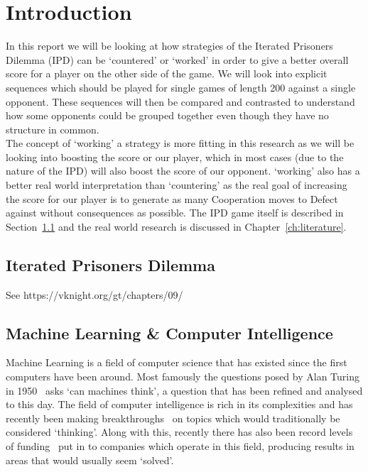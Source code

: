 
\chapter{Introduction}\label{ch:intro}
In this report we will be looking at how strategies of the Iterated Prisoners Dilemma (IPD) can be `countered' or `worked' in order to give a better overall score for a player on the other side of the game.
We will look into explicit sequences which should be played for single games of length 200 against a single opponent.
These sequences will then be compared and contrasted to understand how some opponents could be grouped together even though they have no structure in common.\\

The concept of `working' a strategy is more fitting in this research as we will be looking into boosting the score or our player, which in most cases (due to the nature of the IPD) will also boost the score of our opponent.
`working' also has a better real world interpretation than `countering' as the real goal of increasing the score for our player is to generate as many Cooperation moves to Defect against without consequences as possible.
The IPD game itself is described in Section~\ref{sec:iteratedPrisonersDilemma} and the real world research is discussed in Chapter~\ref{ch:literature}.

\section{Iterated Prisoners Dilemma}\label{sec:iteratedPrisonersDilemma}

See https://vknight.org/gt/chapters/09/

\section{Machine Learning \& Computer Intelligence}\label{sec:machineLearningAndcomputerIntelligence}
Machine Learning is a field of computer science that has existed since the first computers have been around.
Most famously the questions posed by Alan Turing in 1950~\cite{turing1950computing} asks `can machines think', a question that has been refined and analysed to this day.
The field of computer intelligence is rich in its complexities and has recently been making breakthroughs~\cite{knight2017alphaZeroMIT} on topics which would traditionally be considered `thinking'.
Along with this, recently there has also been record levels of funding~\cite{chui2017artificial} put in to companies which operate in this field, producing results in areas that would usually seem `solved'.\\

